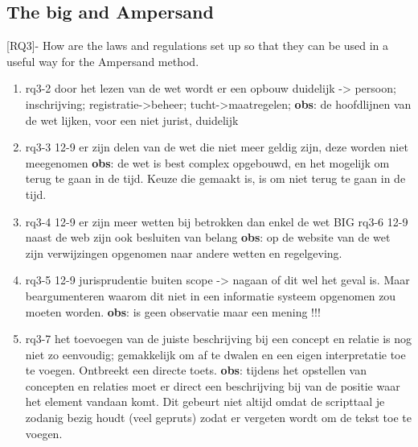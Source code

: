 \begin{comment}
RQ3 - Hoe zijn de wet- en regelgeving opgezet zodat ze kunnen worden gebruikt in een bruikbare manier voor de Ampersand-methode.
\end{comment}
\subsection{The \acrshort{big} and Ampersand}
[RQ3]- How are the laws and regulations set up so that they can be used in a useful way for the Ampersand method.
\begin{enumerate}
    \item rq3-2 door het lezen van de wet wordt er een opbouw duidelijk -> persoon; inschrijving; registratie->beheer; tucht->maatregelen; 
    \newline\textbf{obs}: de hoofdlijnen van de wet lijken, voor een niet jurist, duidelijk

    \item rq3-3 12-9 er zijn delen van de wet die niet meer geldig zijn, deze worden niet meegenomen
    \newline\textbf{obs}: de wet is best complex opgebouwd, en het mogelijk om terug te gaan in de tijd.
    Keuze die gemaakt is, is om niet terug te gaan in de tijd.
    
    \item rq3-4 12-9 er zijn meer wetten bij betrokken dan enkel de wet BIG
    \newline rq3-6 12-9 naast de web zijn ook besluiten van belang
    \newline\textbf{obs}: op de website van de wet zijn verwijzingen opgenomen naar andere wetten en regelgeving.
    
    \item rq3-5 12-9 jurisprudentie buiten scope -> nagaan of dit wel het geval is. 
    Maar beargumenteren waarom dit niet in een informatie systeem opgenomen zou moeten worden.
    \newline\textbf{obs}: is geen observatie maar een mening !!!

    \item rq3-7 het toevoegen van de juiste beschrijving bij een concept en relatie is nog niet zo eenvoudig; gemakkelijk om af te dwalen en een eigen interpretatie toe te voegen. 
    Ontbreekt een directe toets.
    \newline\textbf{obs}: tijdens het opstellen van concepten en relaties moet er direct een beschrijving bij van de positie waar het element vandaan komt.
    Dit gebeurt niet altijd omdat de scripttaal je zodanig bezig houdt (veel gepruts) zodat er vergeten wordt om de tekst toe te voegen.
    

\end{enumerate}
